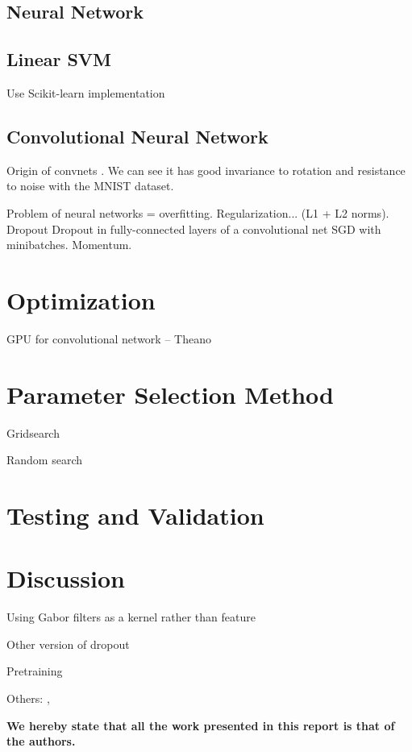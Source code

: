\documentclass{acm_proc_article-sp}
\begin{document}
\subsection{Neural Network}

\subsection{Linear SVM}
Use Scikit-learn implementation \cite{scikit-learn}

\subsection{Convolutional Neural Network}
Origin of convnets \cite{Fukushima}. We can see it has good invariance to rotation and resistance to noise with the MNIST dataset. \cite{LeCun}

Problem of neural networks = overfitting. Regularization... (L1 + L2 norms). Dropout \cite{Hinton}
Dropout in fully-connected layers of a convolutional net \cite{Krizhevsky}
SGD with minibatches.
Momentum.


\section{Optimization} %
GPU for convolutional network -- Theano \cite{Theano}

\section{Parameter Selection Method}%
Gridsearch 

Random search \cite{Bergstra}

\section{Testing and Validation}%

\section{Discussion}%
Using Gabor filters as a kernel rather than feature \cite{Sabri}

Other version of dropout \cite{Wan}

Pretraining \cite{Erhan}

Others: \cite{Rowley}, \cite{Simard}

{\bfseries We hereby state that all the work presented in this report is that of the authors.}




\appendix

\balancecolumns
\end{document}
